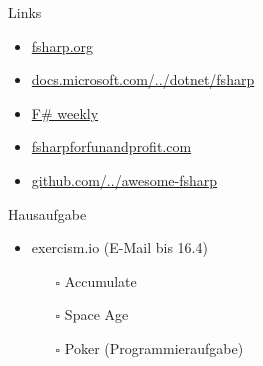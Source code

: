 \documentclass[t]{beamer}
\begin{document}
\begin{frame}[label={sec:org8ff54b1}]{Links}
\begin{itemize}
\item \href{https://fsharp.org/}{fsharp.org}
\item \href{https://docs.microsoft.com/de-de/dotnet/fsharp/}{docs.microsoft.com/../dotnet/fsharp}
\item \href{https://sergeytihon.com/}{F\# weekly}
\item \href{https://fsharpforfunandprofit.com/}{fsharpforfunandprofit.com}
\item \href{https://github.com/fsprojects/awesome-fsharp}{github.com/../awesome-fsharp}
\end{itemize}
\end{frame}

\begin{frame}[label={sec:org3cc3253}]{Hausaufgabe}
\begin{itemize}
\item exercism.io (E-Mail bis 16.4)
\begin{itemize}
\item[{$\square$}] Accumulate
\item[{$\square$}] Space Age
\item[{$\square$}] Poker (Programmieraufgabe)
\end{itemize}
\end{itemize}
\end{frame}
\end{document}

